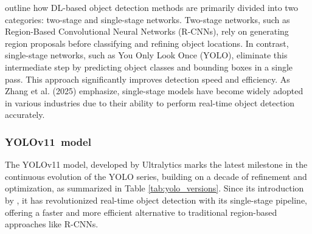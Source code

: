 \documentclass[a4paper,10pt,twocolumn]{article}
\numberwithin{figure}{section}
\numberwithin{table}{section}
\begin{document}
\cite{ZhangLei2025RoMH} outline how DL-based object 
detection methods are primarily divided into two categories: 
two-stage and single-stage networks. 
Two-stage networks, such as Region-Based Convolutional Neural Networks (R-CNNs), 
rely on generating region proposals before classifying and refining object 
locations. In contrast, single-stage networks, such as You Only Look Once (YOLO),
 eliminate this intermediate step by predicting object classes
 and bounding boxes in a single pass. This approach significantly improves 
 detection speed and efficiency. As Zhang et al. (2025) emphasize, 
 single-stage models have become widely adopted in various industries 
 due to their ability to perform real-time object detection accurately.
\vspace{0.3cm}
\subsubsection{\mbox{YOLOv11 model}}
\vspace{0.3cm}

The YOLOv11 model, developed by Ultralytics marks the latest milestone in the continuous evolution
 of the YOLO series, building on a decade of refinement and optimization,
  as summarized in Table \ref{tab:yolo_versions}. Since its introduction
   by \cite{redmon2016you}, it has revolutionized real-time object
    detection with its single-stage pipeline, offering a faster and
     more efficient alternative to traditional region-based 
     approaches like R-CNNs.
\end{document}
